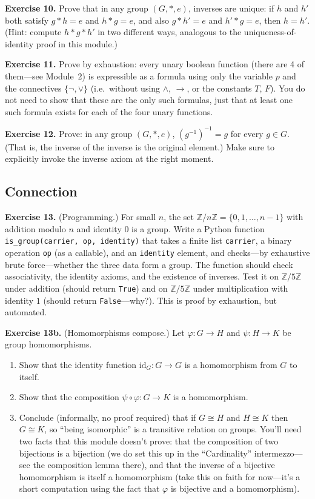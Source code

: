 \documentclass[11pt]{article}
\begin{document}
\textbf{Exercise 10.}\label{ex:m5:10} Prove that in any group $(G, *, e)$, inverses are unique: if $h$ and $h'$ both satisfy $g * h = e$ and $h * g = e$, and also $g * h' = e$ and $h' * g = e$, then $h = h'$. (Hint: compute $h * g * h'$ in two different ways, analogous to the uniqueness-of-identity proof in this module.)

\bigskip
\textbf{Exercise 11.}\label{ex:m5:11} Prove by exhaustion: every unary boolean function (there are 4 of them---see Module~2) is expressible as a formula using only the variable $p$ and the connectives $\{\lnot, \vee\}$ (i.e.\ without using $\wedge$, $\to$, or the constants $T$, $F$). You do not need to show that these are the only such formulas, just that at least one such formula exists for each of the four unary functions.

\bigskip
\textbf{Exercise 12.}\label{ex:m5:12} Prove: in any group $(G, *, e)$, $(g^{-1})^{-1} = g$ for every $g \in G$. (That is, the inverse of the inverse is the original element.) Make sure to explicitly invoke the inverse axiom at the right moment.

\subsection*{Connection}

\textbf{Exercise 13.}\label{ex:m5:13} (Programming.) For small $n$, the set $\mathbb{Z}/n\mathbb{Z} = \{0, 1, \ldots, n-1\}$ with addition modulo $n$ and identity $0$ is a group. Write a Python function \texttt{is\_group(carrier, op, identity)} that takes a finite list \texttt{carrier}, a binary operation \texttt{op} (as a callable), and an \texttt{identity} element, and checks---by exhaustive brute force---whether the three data form a group. The function should check associativity, the identity axioms, and the existence of inverses. Test it on $\mathbb{Z}/5\mathbb{Z}$ under addition (should return \texttt{True}) and on $\mathbb{Z}/5\mathbb{Z}$ under multiplication with identity $1$ (should return \texttt{False}---why?). This is proof by exhaustion, but automated.

\bigskip
\textbf{Exercise 13b.}\label{ex:m5:13b} (Homomorphisms compose.) Let $\varphi : G \to H$ and $\psi : H \to K$ be group homomorphisms.
\begin{enumerate}[label=(\alph*)]
  \item Show that the identity function $\mathrm{id}_G : G \to G$ is a homomorphism from $G$ to itself.
  \item Show that the composition $\psi \circ \varphi : G \to K$ is a homomorphism.
  \item Conclude (informally, no proof required) that if $G \cong H$ and $H \cong K$ then $G \cong K$, so ``being isomorphic'' is a transitive relation on groups. You'll need two facts that this module doesn't prove: that the composition of two bijections is a bijection (we do set this up in the ``Cardinality'' intermezzo---see the composition lemma there), and that the inverse of a bijective homomorphism is itself a homomorphism (take this on faith for now---it's a short computation using the fact that $\varphi$ is bijective and a homomorphism).
\end{enumerate}
\end{document}

